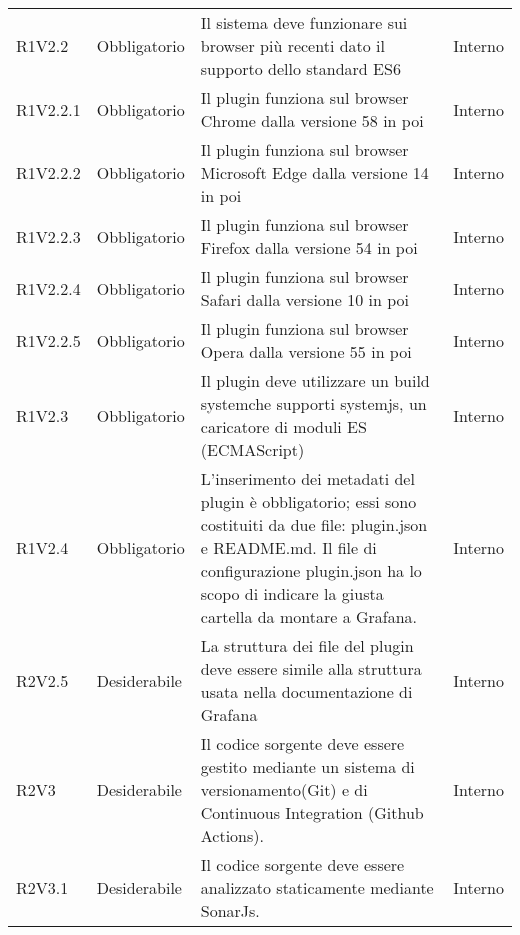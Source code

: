 \begin{longtable} {
		>{\centering}p{18mm} 
		>{\centering}p{28mm}
		>{}p{50mm} 
		>{}p{28mm}
		}
	R1V2.2 & 
	Obbligatorio & 
	Il sistema deve funzionare sui browser più recenti dato il supporto dello standard ES6 &
	Interno  \TBstrut \\ [2mm]
	
	R1V2.2.1 & 
	Obbligatorio & 
	Il plugin funziona sul browser Chrome dalla versione 58 in poi &
	Interno  \TBstrut \\ [2mm]
	
	R1V2.2.2 & 
	Obbligatorio & 
	Il plugin funziona sul browser Microsoft Edge dalla versione 14 in poi &
	Interno  \TBstrut \\ [2mm]
	
	R1V2.2.3 & 
	Obbligatorio & 
	Il plugin funziona sul browser Firefox dalla versione 54 in poi &
	Interno  \TBstrut \\ [2mm]
	
	R1V2.2.4 & 
	Obbligatorio & 
	Il plugin funziona sul browser Safari dalla versione 10 in poi &
	Interno  \TBstrut \\ [2mm]
	
	R1V2.2.5 & 
	Obbligatorio & 
	Il plugin funziona sul browser Opera dalla versione 55 in poi &
	Interno  \TBstrut \\ [2mm]
	
	R1V2.3 & 
	Obbligatorio & 
	Il plugin deve utilizzare un build system\glosp che supporti systemjs, un caricatore di moduli ES (ECMAScript) &
	Interno  \TBstrut \\ [2mm]

	R1V2.4 & 
	Obbligatorio & 
	L'inserimento dei metadati del plugin è obbligatorio; essi sono costituiti da due file: plugin.json e README.md. Il file di configurazione plugin.json ha lo scopo di indicare la giusta cartella da montare a Grafana\glo . &
	Interno  \TBstrut \\ [2mm]
	
	R2V2.5 &
	Desiderabile &
	La struttura dei file del plugin deve essere simile alla struttura usata nella documentazione di Grafana\glo &
	Interno  \TBstrut \\ [2mm]
		
	R2V3 &
	Desiderabile &
	Il codice sorgente deve essere gestito mediante un sistema di versionamento\glosp (Git) e di Continuous Integration (Github Actions). &
	Interno  \TBstrut \\ [2mm]		
	
	R2V3.1 &
	Desiderabile &
	Il codice sorgente deve essere analizzato staticamente mediante SonarJs\glo . &
	Interno  \TBstrut \\ [2mm]
	

\end{longtable}
